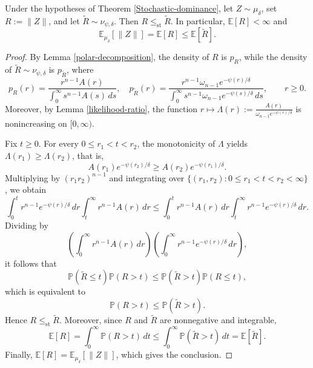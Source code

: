 \documentclass[10pt,a4paper]{amsart}
\begin{document}
\begin{proposition}\label{stochastic-dominance-lemma}
Under the hypotheses of Theorem \ref{Stochastic-dominance}, let
\(Z\sim\mu_\delta\), set \(R:=\|Z\|\), and let \(\widetilde R\sim\nu_{\psi,\delta}\).
Then \(R\le_{\textrm{st}}\widetilde R\). In particular, \(\mathbb{E}[R]<\infty\) and
\[
\mathbb{E}_{\mu_\delta}[\|Z\|]
=
\mathbb{E}[R]
\le
\mathbb{E}[\widetilde R].
\]
\end{proposition}

\begin{proof}
By Lemma \ref{polar-decomposition}, the density of \(R\) is \(p_R\), while the density of \(\widetilde R\sim\nu_{\psi,\delta}\) is \(p_{\widetilde R}\), where
\[
p_R(r)=\frac{r^{n-1}A(r)}{\displaystyle\int_0^\infty s^{n-1}A(s)\,ds},
\quad
p_{\widetilde R}(r)=
\frac{r^{n-1}\omega_{n-1}e^{-\psi(r)/\delta}}
{\displaystyle\int_0^\infty s^{n-1}\omega_{n-1}e^{-\psi(s)/\delta}\,ds},
\qquad r\ge 0.
\]
Moreover, by Lemma \ref{likelihood-ratio}, the function $r\mapsto \Lambda(r):=\frac{A(r)}{\omega_{n-1}e^{-\psi(r)/\delta}}$ is nonincreasing on \([0,\infty)\).

Fix \(t\ge 0\). For every \(0\le r_1<t<r_2\), the monotonicity of \(\Lambda\) yields $\Lambda(r_1)\ge \Lambda(r_2)$,  that is,
\[
A(r_1)e^{-\psi(r_2)/\delta}\ge A(r_2)e^{-\psi(r_1)/\delta}.
\]
Multiplying by \((r_1r_2)^{n-1}\) and integrating over
\(\{(r_1,r_2):0\le r_1<t<r_2<\infty\}\), we obtain
\[
\int_0^t r^{n-1}e^{-\psi(r)/\delta}\,dr
\int_t^\infty r^{n-1}A(r)\,dr
\le
\int_0^t r^{n-1}A(r)\,dr
\int_t^\infty r^{n-1}e^{-\psi(r)/\delta}\,dr.
\]
Dividing by
\[
\left(\int_0^\infty r^{n-1}A(r)\,dr\right)
\left(\int_0^\infty r^{n-1}e^{-\psi(r)/\delta}\,dr\right),
\]
it follows that
\[
\mathbb{P}(\tilde{R} \leq t) \mathbb{P}(R>t)\le \mathbb{P}(\widetilde R>t) \mathbb{P}(R\leq t),
\]
which is equivalent to
\[
\mathbb{P}(R>t)\le \mathbb{P}(\widetilde R>t).
\]
Hence \(R\le_{\textrm{st}}\widetilde R\).  Moreover, since \(R\) and \(\widetilde R\) are nonnegative and integrable,
\[
\mathbb{E}[R]
=
\int_0^\infty \mathbb{P}(R>t)\,dt
\le
\int_0^\infty \mathbb{P}(\widetilde R>t)\,dt
=
\mathbb{E}[\widetilde R].
\]
Finally, \(\mathbb{E}[R]=\mathbb{E}_{\mu_\delta}[\|Z\|]\), which gives the conclusion.
\end{proof}
\end{document}
